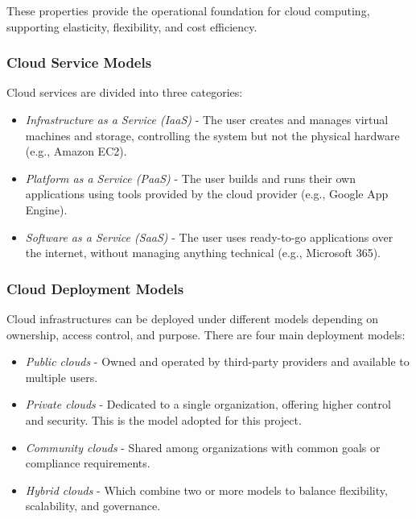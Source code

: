\documentclass[sigplan]{acmart}
\begin{document}
            These properties provide the operational foundation for cloud computing, supporting elasticity, flexibility, and cost efficiency.
        
        \subsubsection{Cloud Service Models}
            Cloud services are divided into three categories\cite{mellNISTDefinitionCloud}:
            \begin{itemize}
                \item \textit{Infrastructure as a Service (IaaS)} - The user creates and manages virtual machines and storage, controlling the system but not the physical hardware (e.g., Amazon EC2).
            
                \item \textit{Platform as a Service (PaaS)} - The user builds and runs their own applications using tools provided by the cloud provider (e.g., Google App Engine).
            
                \item \textit{Software as a Service (SaaS)} - The user uses ready-to-go applications over the internet, without managing anything technical (e.g., Microsoft 365).
            \end{itemize}
        
        \subsubsection{Cloud Deployment Models}
            Cloud infrastructures can be deployed under different models depending on ownership, access control, and purpose. There are four main deployment models\cite{mellNISTDefinitionCloud}:
            \begin{itemize}
                \item \textit{Public clouds} - Owned and operated by third-party providers and available to multiple users.
                \item \textit{Private clouds} - Dedicated to a single organization, offering higher control and security. This is the model adopted for this project.
                \item \textit{Community clouds} - Shared among organizations with common goals or compliance requirements.
                \item \textit{Hybrid clouds} - Which combine two or more models to balance flexibility, scalability, and governance. 
            \end{itemize}
            
\end{document}
